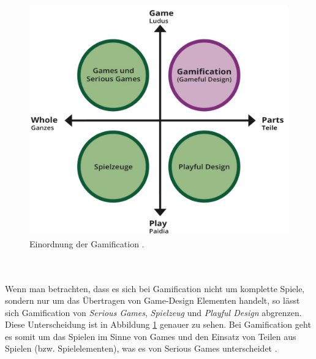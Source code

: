 \documentclass[a4paper,12pt]{scrartcl}
\begin{document}
\begin{figure}[h!]
\begin{center}
\includegraphics[scale = 0.4]{Bilder/PlayGame.eps}
\caption{Einordnung der Gamification \cite{PlayGame2018}.}
\label{PlayGameBild}
\end{center}
\end{figure}
\\\\
Wenn man betrachten, dass es sich bei Gamification nicht um komplette Spiele, sondern nur um das Übertragen von Game-Design Elementen handelt, so lässt sich Gamification von \textit{Serious Games}, \textit{Spielzeug} und \textit{Playful Design} abgrenzen. Diese Unterscheidung ist in Abbildung \ref{PlayGameBild} genauer zu sehen. Bei Gamification geht es somit um das Spielen im Sinne von Games und den Einsatz von Teilen aus Spielen (bzw. Spielelementen), was es von Serious Games unterscheidet \cite{PlayGame2018}.
\end{document}
